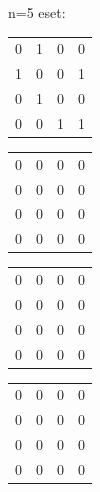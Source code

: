 \documentclass[paper=a4, fontsize=11pt]{article}
\begin{document}
n=5 eset:
\begin{tabular}{cccc}
0&1&0&0\\
1&0&0&1\\
0&1&0&0\\
0&0&1&1
\end{tabular}
\quad
\begin{tabular}{cccc}
0&0&0&0\\
0&0&0&0\\
0&0&0&0\\
0&0&0&0
\end{tabular}
\quad
\begin{tabular}{cccc}
0&0&0&0\\
0&0&0&0\\
0&0&0&0\\
0&0&0&0
\end{tabular}
\quad
\begin{tabular}{cccc}
0&0&0&0\\
0&0&0&0\\
0&0&0&0\\
0&0&0&0
\end{tabular}


\newpage
\end{document}
